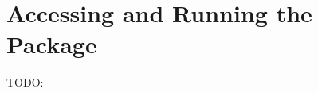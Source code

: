 \documentclass[BTech]{iitmdiss}
\begin{document}

    \appendix


    \chapter{Accessing and Running the Package} \label{ch:code}

    TODO:

    \begin{singlespace}
        
    \end{singlespace}
\end{document}
